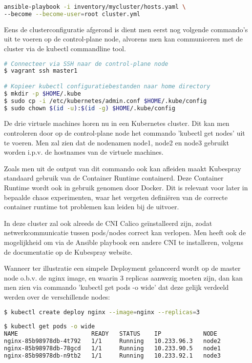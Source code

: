 \begin{lstlisting}[language=bash]
ansible-playbook -i inventory/mycluster/hosts.yaml \
--become --become-user=root cluster.yml
\end{lstlisting}

Eens de clusterconfiguratie afgerond is dient men eerst nog volgende commando's uit te voeren op de control-plane node, alvorens men kan communiceren met de cluster via de kubectl commandline tool. 
\begin{lstlisting}[language=bash] 
# Connecteer via SSH naar de control-plane node    
$ vagrant ssh master1

# Kopieer kubectl configuratiebestanden naar home directory
$ mkdir -p $HOME/.kube
$ sudo cp -i /etc/kubernetes/admin.conf $HOME/.kube/config
$ sudo chown $(id -u):$(id -g) $HOME/.kube/config
\end{lstlisting}

De drie virtuele machines horen nu in een Kubernetes cluster. Dit kan men controleren door op de control-plane node het commando 'kubectl get nodes' uit te voeren. 
Men zal zien dat de nodenamen node1, node2 en node3 gebruikt worden i.p.v. de hostnames van de virtuele machines.

Zoals men uit de output van dit commando ook kan afleiden maakt Kubespray standaard gebruik van de Container Runtime containerd. Deze Container Runtime wordt ook in gebruik genomen door Docker. Dit is relevant voor later in bepaalde chaos experimenten, waar het vergeten definiëren van de correcte container runtime tot problemen kan leiden bij de uitvoer. 

In deze cluster zal ook alreeds de CNI Calico geïnstalleerd zijn, zodat netwerkcommunicatie tussen pods/nodes correct kan verlopen. Men heeft ook de mogelijkheid om via de Ansible playbook een andere CNI te installeren, volgens de documentatie op de Kubespray website. 

Wanneer ter illustratie een simpele Deployment gelanceerd wordt op de master node o.b.v. de nginx image, en waarin 3 replicas aanwezig moeten zijn, dan kan men zien via commando 'kubectl get pods -o wide' dat deze gelijk verdeeld werden over de verschillende nodes:

\begin{lstlisting}[language=bash]
$ kubectl create deploy nginx --image=nginx --replicas=3
        
$ kubectl get pods -o wide
NAME                     READY   STATUS    IP            NODE
nginx-85b98978db-4t792   1/1     Running   10.233.96.3   node2
nginx-85b98978db-78gcd   1/1     Running   10.233.90.5   node1
nginx-85b98978db-n9tb2   1/1     Running   10.233.92.1   node3
\end{lstlisting}

